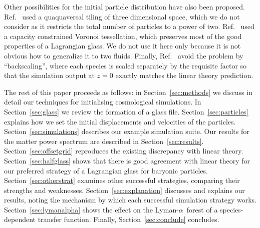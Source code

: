 \documentclass[a4paper,11pt]{article}
\newcommand{\Lya}{Lyman-$\alpha$}
\begin{document}

Other possibilities for the initial particle distribution have also been proposed. Ref.~\cite{Hansen:2007} used a quaquaversal tiling of three dimensional space, which we do not consider as it restricts the total number of particles to a power of two. Ref.~\cite{Liao:2018} used a capacity constrained Voronoi tessellation, which preserves most of the good properties of a Lagrangian glass. We do not use it here only because it is not obvious how to generalize it to two fluids. Finally, Ref.~\cite{Zennaro:2017} avoid the problem by ``backscaling'', where each species is scaled separately by the requisite factor so that the simulation output at $z=0$ exactly matches the linear theory prediction.

The rest of this paper proceeds as follows: in Section~\ref{sec:methods} we discuss in detail our techniques for initialising cosmological simulations. In Section~\ref{sec:glass} we review the formation of a glass file. Section~\ref{sec:particles} explains how we set the initial displacements and velocities of the particles. Section~\ref{sec:simulations} describes our example simulation suite. Our results for the matter power spectrum are described in Section~\ref{sec:results}. Section~\ref{sec:offsetgrid} reproduces the existing discrepancy with linear theory. Section~\ref{sec:halfglass} shows that there is good agreement with linear theory for our preferred strategy of a Lagrangian glass for baryonic particles. Section~\ref{sec:otherstrat} examines other successful strategies, comparing their strengths and weaknesses. Section~\ref{sec:explanation} discusses and explains our results, noting the mechanism by which each successful simulation strategy works.
Section~\ref{sec:lymanalpha} shows the effect on the \Lya~forest of a species-dependent transfer function.
Finally, Section~\ref{sec:conclude} concludes.
\end{document}
